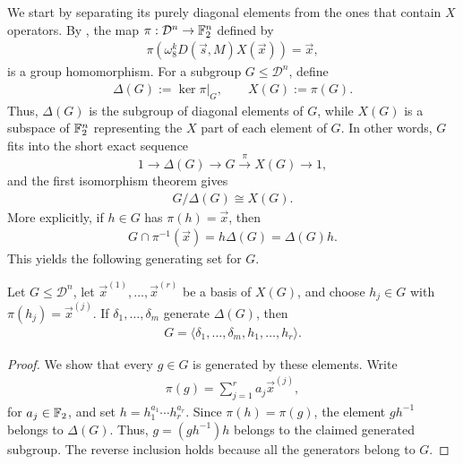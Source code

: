 We start by separating its purely diagonal elements from the ones that contain $X$ operators.
By , the map $\pi:\mathcal{D}^n\to\mathbb{F}_2^n$ defined by
\begin{align}
    \pi\left(\omega_8^kD(\vec{s},M)X(\vec{x})\right)=\vec{x},
\end{align}
is a group homomorphism. For a subgroup
$G\leq\mathcal{D}^n$, define
\begin{align}
    \Delta(G):=\ker\pi|_G,
    \qquad
    X(G):=\pi(G).
\end{align}
Thus, $\Delta(G)$ is the subgroup of diagonal elements
of $G$, while $X(G)$ is a subspace of $\mathbb{F}_2^n$ representing the $X$ part of each element of $G$.
In other words, $G$ fits into the short exact sequence
\begin{equation}\label{eq:dcp-ses}
    1 \rightarrow \Delta(G) \rightarrow G \xrightarrow{\pi} X(G) \rightarrow 1,
\end{equation}
and the first isomorphism theorem gives
\begin{align}
    G/\Delta(G)\cong X(G).
\end{align}
More explicitly, if $h\in G$ has $\pi(h)=\vec{x}$, then
\begin{align}
    G\cap\pi^{-1}(\vec{x})
    =h\Delta(G)=\Delta(G)h.
\end{align}
This yields the following generating set for $G$.

\begin{proposition}
    \label{prop:dcp-generators}
    Let $G\leq\mathcal{D}^n$, let
    $\vec{x}^{(1)},\ldots,\vec{x}^{(r)}$ be a basis of $X(G)$,
    and choose $h_j\in G$ with $\pi(h_j)=\vec{x}^{(j)}$.
    If $\delta_1,\ldots,\delta_m$ generate $\Delta(G)$,
    then
    \begin{align}
        G=\langle
            \delta_1,\ldots,\delta_m,h_1,\ldots,h_r
        \rangle.
    \end{align}
\end{proposition}

\begin{proof}
    We show that every $g\in G$ is generated by these
    elements. Write
    \begin{align}
        \pi(g)=\sum_{j=1}^r a_j\vec{x}^{(j)},
    \end{align}
    for $a_j\in\mathbb{F}_2$, and set $h=h_1^{a_1}\cdots h_r^{a_r}$.
    Since $\pi(h)=\pi(g)$, the element $gh^{-1}$ belongs to $\Delta(G)$. Thus, $g=(gh^{-1})h$ belongs to the claimed generated subgroup.
    The reverse inclusion holds because all the generators belong to $G$.
\end{proof}

